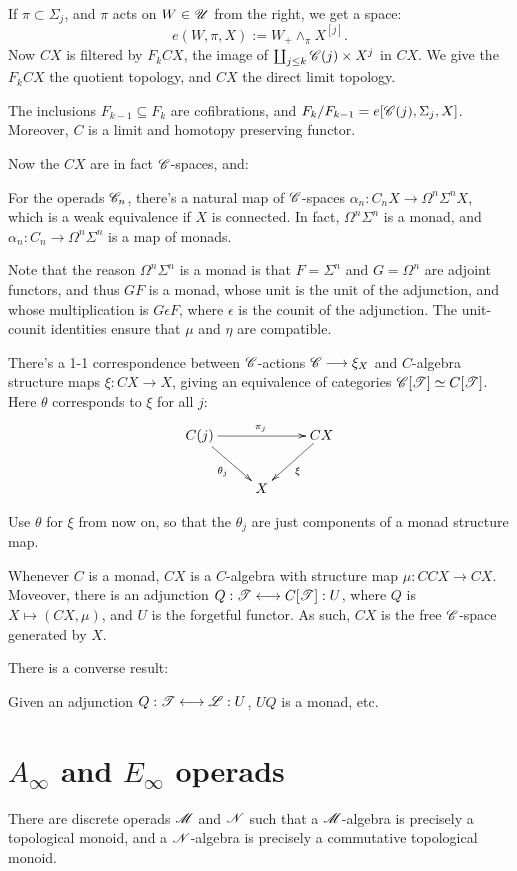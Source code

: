 \documentclass[11pt]{article}
\begin{document}
\begin{chapter1-3}
If $\pi\subset\Sigma_j$, 
and $\pi$ acts on $W\in\mathscr{U}$ from the right, we get a space:
\[e(W,\pi,X):=W_+\wedge_\pi X^{[j]}.\]
Now $CX$ is filtered by $F_kCX$, the image of
$\coprod_{j\leq k}\mathscr{C}(j)\times X^j$ in $CX$. We give the $F_kCX$ the quotient topology, and $CX$ the direct limit topology.
\begin{prop*}[2.6]
The inclusions
$F_{k-1}\subseteq F_{k}$ are cofibrations, and $F_{k}/F_{k-1}=e[\mathscr{C}(j),\Sigma_j,X]$. Moreover, $C$ is a limit and homotopy preserving
functor.
\end{prop*}
Now the $CX$ are in fact $\mathscr{C}$-spaces, and:
\begin{thm*}[2.7 --- Approximation]
For the operads $\mathscr{C}_n$, there's a natural map of $\mathscr{C}$-spaces
$\alpha_n:C_nX\to\Omega^n\Sigma^nX$, which is a weak equivalence if $X$
is connected. In fact, $\Omega^n\Sigma^n$ is a monad, and 
$\alpha_n:C_n\to\Omega^n\Sigma^n$ is a map of monads.
\end{thm*}
\noindent
Note that the reason $\Omega^n\Sigma^n$ is a monad is that $F=\Sigma^n$
and $G=\Omega^n$ are adjoint functors, and thus $GF$ is a monad, whose unit is
the unit of the adjunction, and whose multiplication is $G\epsilon F$, where
$\epsilon$ is the counit of the adjunction. The unit-counit identities ensure
that $\mu$ and $\eta$ are compatible.
\begin{prop*}[2.8]
There's a 1-1 correspondence between $\mathscr{C}$-actions $\mathscr{C}\longrightarrow\xi_X$ and 
$C$-algebra structure maps $\xi:CX\to X$, giving an equivalence of categories 
$\mathscr{C}[\mathscr{T}]\simeq C[\mathscr{T}]$. Here $\theta$ corresponds to $\xi$ \Iff for all $j$:
\[\xymatrix{\ar[rd]_{\theta_j}C(j)\ar[rr]^{\pi_j}&&CX\ar[dl]^\xi\\
&X}\]
\end{prop*}
\noindent
Use $\theta$ for $\xi$ from now on, so that the $\theta_j$ are just components
of a monad structure map.
\begin{lem*}[2.9]
Whenever $C$ is a monad, $CX$ is a $C$-algebra with structure map $\mu:CCX\to CX$.
Moveover, there is an adjunction $Q:\mathscr{T}\longleftrightarrow C[\mathscr{T}]:U$, where $Q$
is $X\mapsto (CX,\mu)$, and $U$ is the forgetful functor. As such, $CX$ is
the free $\mathscr{C}$-space generated by $X$.
\end{lem*}
There is a converse result:
\begin{lem*}[2.10]
Given an adjunction $Q:\mathscr{T}\longleftrightarrow \mathscr{L}:U$, $UQ$ is a monad, etc.
\end{lem*}

\section{\texorpdfstring{$A_\infty$ and $E_\infty$}{A and E} operads}
There are discrete operads $\mathscr{M}$ and $\mathscr{N}$ such that a $\mathscr{M}$-algebra is 
precisely a topological monoid, and a $\mathscr{N}$-algebra is precisely a
commutative topological monoid.


\end{chapter1-3}
\end{document}
